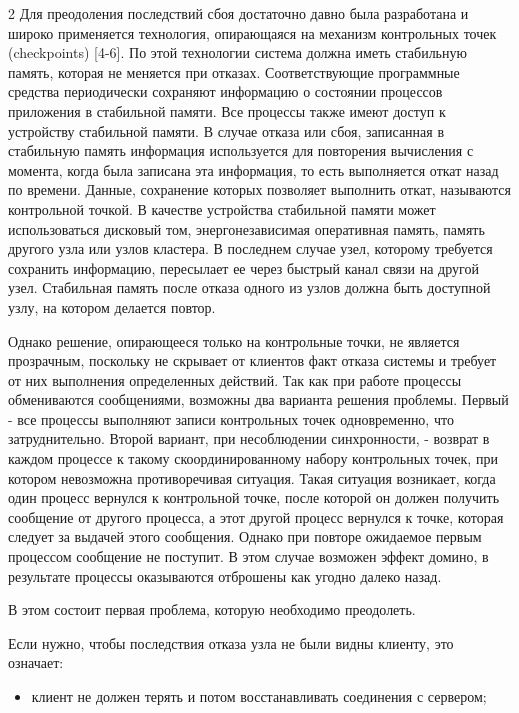 \begin{multicols}{2}
Для преодоления последствий сбоя достаточно давно была разработана и широко применяется технология, опирающаяся на механизм контрольных точек (checkpoints) [4-6]. По этой технологии система должна иметь стабильную память, которая не меняется при отказах. Соответствующие программные средства периодически сохраняют информацию о состоянии процессов приложения в стабильной памяти. Все процессы также имеют доступ к устройству стабильной памяти.  В случае отказа или сбоя, записанная в стабильную память информация используется для повторения вычисления с момента, когда была записана эта информация, то есть выполняется откат назад по времени. Данные, сохранение которых позволяет выполнить откат, называются контрольной точкой. В качестве устройства стабильной памяти может использоваться дисковый том, энергонезависимая оперативная память, память другого узла или узлов кластера. В последнем случае узел, которому требуется сохранить информацию, пересылает ее через быстрый канал связи на другой узел. Стабильная память после отказа одного из узлов должна быть доступной узлу, на котором делается повтор.



Однако решение, опирающееся только на контрольные точки, не является прозрачным, поскольку не скрывает от клиентов факт отказа системы и требует от них выполнения определенных действий. Так как при работе процессы обмениваются сообщениями, возможны два варианта решения проблемы. Первый - все процессы выполняют записи контрольных точек одновременно, что затруднительно. Второй вариант, при несоблюдении синхронности, - возврат в каждом процессе к такому скоординированному набору контрольных точек, при котором невозможна противоречивая ситуация. Такая ситуация возникает, когда один процесс вернулся к контрольной точке, после которой он должен получить сообщение от другого процесса, а этот другой процесс вернулся к точке, которая следует за выдачей этого сообщения. Однако при повторе ожидаемое первым процессом сообщение не поступит. В этом случае  возможен эффект домино, в результате процессы оказываются отброшены как угодно далеко назад.



В этом состоит первая проблема, которую необходимо преодолеть.



Если нужно, чтобы последствия отказа узла не были видны клиенту,  это означает:

\begin{itemize}

\item клиент не должен терять и потом восстанавливать соединения с сервером;


\end{itemize}
\end{multicols}
